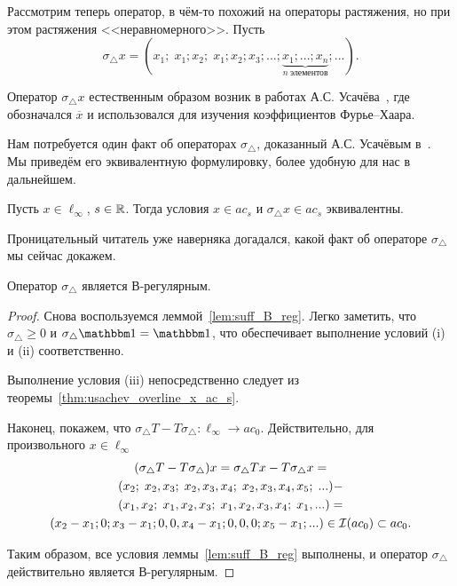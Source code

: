 Рассмотрим теперь оператор,
в чём-то похожий на операторы растяжения,
но при этом растяжения <<неравномерного>>.
Пусть
\begin{equation}
	\sigma_\triangle x =
	(x_1; \; x_1; x_2; \; x_1; x_2; x_3; ... ; \underbrace{x_1; ...; x_n}_{n~\mbox{элементов}}; ...)
	.
\end{equation}

\begin{remark}
	Оператор $\sigma_\triangle x$ естественным образом возник в работах А.С. Усачёва~\cite{usachev2009_phd_vsu},
	где обозначался $\overline{x}$ и
	использовался для изучения коэффициентов Фурье--Хаара.
\end{remark}

Нам потребуется один факт об операторах $\sigma_\triangle$,
доказанный А.С. Усачёвым в~\cite[теорема 19]{usachev2009_phd_vsu}.
Мы приведём его эквивалентную формулировку, более удобную для нас в дальнейшем.

\begin{theorem}
	\label{thm:usachev_overline_x_ac_s}
	Пусть $x\in\ell_\infty$, $s\in\mathbb{R}$.
	Тогда условия $x\in ac_s$ и $\sigma_\triangle x \in ac_s$ эквивалентны.
\end{theorem}

Проницательный читатель уже наверняка догадался,
какой факт об операторе $\sigma_\triangle$ мы сейчас докажем.

\begin{theorem}
	Оператор $\sigma_\triangle$ является В-регулярным.
\end{theorem}

\begin{proof}
	Снова воспользуемся леммой~\ref{lem:suff_B_reg}.
	Легко заметить, что $\sigma_\triangle \geq 0$ и $\sigma_\triangle \one  = \one$,
	что обеспечивает выполнение условий (i) и (ii) соответственно.

	Выполнение условия (iii) непосредственно следует из теоремы~\ref{thm:usachev_overline_x_ac_s}.

	Наконец, покажем, что $\sigma_\triangle T - T \sigma_\triangle  : \ell_\infty \to ac_0$.
	Действительно, для произвольного $x\in\ell_\infty$
	\begin{multline}
	(\sigma_\triangle T - T \sigma_\triangle)x =
	\sigma_\triangle Tx - T \sigma_\triangle x =
	\\
	(x_2; \; x_2, x_3; \; x_2, x_3,   x_4; \; x_2, x_3, x_4, x_5; \; ... )-
	\\
	(x_1, x_2; \; x_1,    x_2, x_3; \; x_1,   x_2, x_3, x_4; \; x_1, ... )=
	\\
	(x_2-x_1; 0; x_3-x_1; 0, 0, x_4-x_1; 0,0,0; x_5-x_1; ...) \in\mathcal{I}(ac_0)\subset ac_0
	.
	\end{multline}

	Таким образом, все условия леммы~\ref{lem:suff_B_reg} выполнены,
	и оператор $\sigma_\triangle$ действительно является В-регулярным.
\end{proof}

